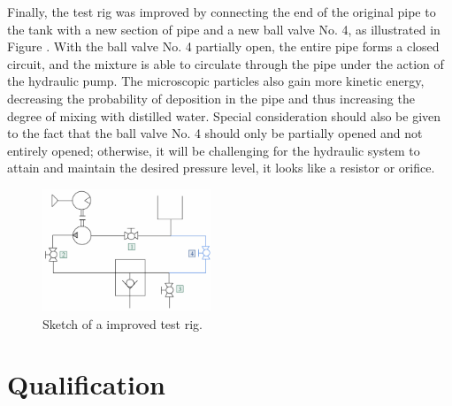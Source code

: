 Finally, the test rig was improved by connecting the end of the original pipe to the tank with a new section of
pipe and a new ball valve No. 4, as illustrated in Figure . With the ball valve No. 4 partially open, 
the entire pipe forms a closed circuit, and the mixture is able to circulate through the pipe under 
the action of the hydraulic pump. The microscopic particles also gain more kinetic energy, decreasing 
the probability of deposition in the pipe and thus increasing the degree of mixing with distilled water. 
Special consideration should also be given to the fact that the ball valve No. 4 should only be partially 
opened and not entirely opened; otherwise, it will be challenging for the hydraulic system 
to attain and maintain the desired pressure level, it looks like a resistor or orifice.

\begin{figure}[H]
    \centering
    \includegraphics[width=0.45\textwidth]{figures/TestRig/newTestRig.jpg}
    \caption{Sketch of a improved test rig.}
    \label{fig:newTestRig}
\end{figure}

\section{Qualification}
\label{Qualification}